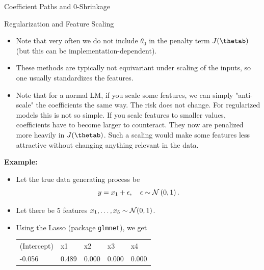 \begin{vbframe}{Coefficient Paths and 0-Shrinkage}
\end{vbframe}

\begin{vbframe}{Regularization and Feature Scaling}

  \begin{itemize}
    \item Note that very often we do not include $\theta_0$ in the penalty term $J(\thetab)$ (but this can be implementation-dependent).
    \item These methods are typically not equivariant under scaling of the inputs, so one usually standardizes the features. 
    \item Note that for a normal LM, if you scale some features, we can simply "anti-scale" the coefficients the same way. The risk does not change. For regularized models this is not so simple. If you scale features to smaller values, coefficients have to become larger to counteract. They now are penalized more heavily in $J(\thetab)$. Such a scaling would make some features less attractive without changing anything relevant in the data.
      
  \end{itemize}

\framebreak

\textbf{Example:}
\begin{itemize}
\item Let the true data generating process be
$$ y = x_1 + \epsilon, \quad \epsilon \sim \mathcal{N} \left(0, 1\right).$$
\item Let there be 5 features $x_1, \ldots, x_5 \sim \mathcal{N} (0,1)$.
\item Using the Lasso (package \texttt{glmnet}), we get
\footnotesize
\vspace{0.2cm}

\begin{table}[]
\begin{tabular}{lllll}
(Intercept) & x1    & x2    & x3    & x4    \\
-0.056      & 0.489 & 0.000 & 0.000 & 0.000 
\end{tabular}
\end{table}



\end{itemize}
\end{vbframe}
